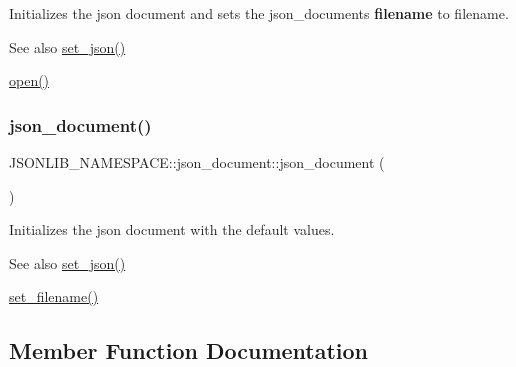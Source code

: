 Initializes the json document and sets the json\+\_\+documents {\bfseries filename} to {\ttfamily filename}. 

\begin{DoxySeeAlso}{See also}
\hyperlink{classJSONLIB__NAMESPACE_1_1json__document_a5a72e4dc0b37b95c70baefad930b5b71}{set\+\_\+json()} 

\hyperlink{classJSONLIB__NAMESPACE_1_1json__document_a08e509059e628742f35716dddce2d740}{open()} 
\end{DoxySeeAlso}
\mbox{\label{classJSONLIB__NAMESPACE_1_1json__document_acf256862749f93052ab0a5ad54272c3e}} 
\subsubsection{\texorpdfstring{json\+\_\+document()}{json\_document()}\hspace{0.1cm}{\footnotesize\ttfamily [6/6]}}
{\footnotesize\ttfamily J\+S\+O\+N\+L\+I\+B\+\_\+\+N\+A\+M\+E\+S\+P\+A\+C\+E\+::json\+\_\+document\+::json\+\_\+document (\begin{DoxyParamCaption}{ }\end{DoxyParamCaption})}



Initializes the json document with the default values. 

\begin{DoxySeeAlso}{See also}
\hyperlink{classJSONLIB__NAMESPACE_1_1json__document_a5a72e4dc0b37b95c70baefad930b5b71}{set\+\_\+json()} 

\hyperlink{classJSONLIB__NAMESPACE_1_1json__document_acc406344661e361c75ac7bc307057712}{set\+\_\+filename()} 
\end{DoxySeeAlso}


\subsection{Member Function Documentation}
\mbox{\label{classJSONLIB__NAMESPACE_1_1json__document_a6f362476926f33fb8c3437d15052e959}} 
